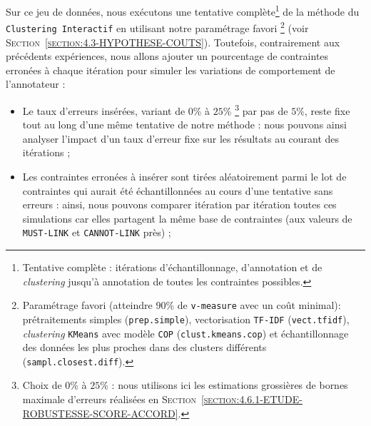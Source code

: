 			Sur ce jeu de données, nous exécutons une tentative complète\footnote{
				Tentative complète : itérations d'échantillonnage, d'annotation et de \textit{clustering} jusqu'à annotation de toutes les contraintes possibles.
			} de la méthode du \texttt{Clustering Interactif} en utilisant notre paramétrage favori \footnote{
				Paramétrage favori (atteindre $90$\% de \texttt{v-measure} avec un coût minimal): prétraitements simples (\texttt{prep.simple}), vectorisation \texttt{TF-IDF} (\texttt{vect.tfidf}), \textit{clustering} \texttt{KMeans} avec modèle \texttt{COP} (\texttt{clust.kmeans.cop}) et échantillonnage des données les plus proches dans des clusters différents (\texttt{sampl.closest.diff}).
			} (voir \textsc{Section~\ref{section:4.3-HYPOTHESE-COUTS}}).
			Toutefois, contrairement aux précédents expériences, nous allons ajouter un pourcentage de contraintes erronées à chaque itération pour simuler les variations de comportement de l'annotateur :
			\begin{itemize}
				\item Le taux d'erreurs insérées, variant de $0$\% à $25$\% \footnote{
					Choix de $0$\% à $25$\% : nous utilisons ici les estimations grossières de bornes maximale d'erreurs réalisées en \textsc{Section~\ref{section:4.6.1-ETUDE-ROBUSTESSE-SCORE-ACCORD}}.
				} par pas de $5$\%, reste fixe tout au long d'une même tentative de notre méthode : nous pouvons ainsi analyser l'impact d'un taux d'erreur fixe sur les résultats au courant des itérations ;
				\item Les contraintes erronées à insérer sont tirées aléatoirement parmi le lot de contraintes qui aurait été échantillonnées au cours d'une tentative sans erreurs : ainsi, nous pouvons comparer itération par itération toutes ces simulations car elles partagent la même base de contraintes (aux valeurs de \texttt{MUST-LINK} et \texttt{CANNOT-LINK} près) ;
			\end{itemize}
			
